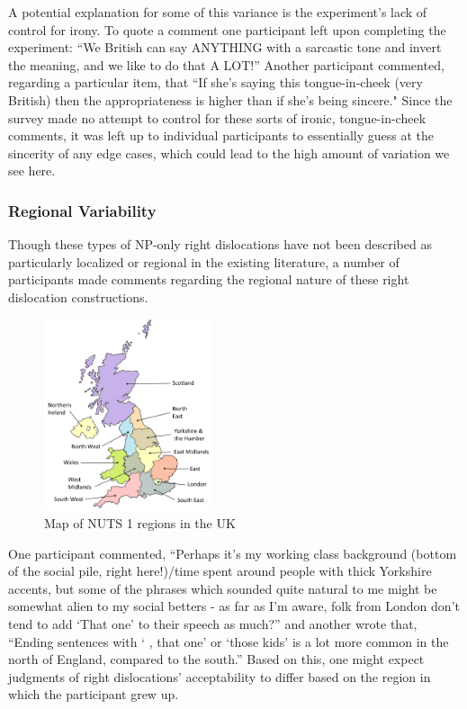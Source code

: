 \documentclass[titlepage,12pt]{article}
\begin{document}
A potential explanation for some of this variance is the experiment's lack of control for irony. To quote a comment one participant left upon completing the experiment: ``We British can say ANYTHING with a sarcastic tone and invert the meaning, and we like to do that A LOT!'' Another participant commented, regarding a particular item, that ``If she's saying this tongue-in-cheek (very British) then the appropriateness is higher than if she's being sincere." Since the survey made no attempt to control for these sorts of ironic, tongue-in-cheek comments, it was left up to individual participants to essentially guess at the sincerity of any edge cases, which could lead to the high amount of variation we see here.

\subsubsection{Regional Variability}

Though these types of NP-only right dislocations have not been described as particularly localized or regional in the existing literature, a number of participants made comments regarding the regional nature of these right dislocation constructions.

\begin{figure}
 \centering
    \includegraphics[width=0.44\textwidth]{United_Kingdom_NUTS_1_B.png}
  \caption[Map of NUTS 1 regions in the UK]{Map of NUTS 1 regions in the UK\protect\footnotemark}
      \label{map}
\end{figure}

One participant commented, ``Perhaps it's my working class background (bottom of the social pile, right here!)/time spent around people with thick Yorkshire accents, but some of the phrases which sounded quite natural to me might be somewhat alien to my social betters - as far as I'm aware, folk from London don't tend to add `That one' to their speech as much?'' and another wrote that, ``Ending sentences with ` , that one' or `those kids' is a lot more common in the north of England, compared to the south.'' Based on this, one might expect judgments of right dislocations' acceptability to differ based on the region in which the participant grew up.
\end{document}
